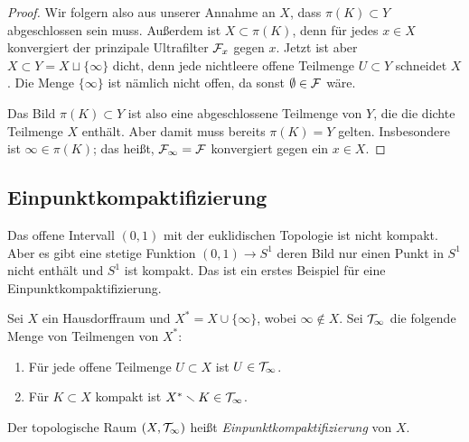 \begin{proof}
  Wir folgern also aus unserer Annahme an $X$, dass $\pi(K)\subset Y$ abgeschlossen sein muss. Außerdem ist $X\subset\pi(K)$, denn für jedes $x\in X$ konvergiert der prinzipale Ultrafilter $\cal F_x$ gegen $x$. Jetzt ist aber $X\subset Y = X\sqcup\{\infty\}$ dicht, denn jede nichtleere offene Teilmenge $U\subset Y$ schneidet $X$. Die Menge $\{\infty\}$ ist nämlich nicht offen, da sonst $\emptyset\in\cal F$ wäre.

  Das Bild $\pi(K)\subset Y$ ist also eine abgeschlossene Teilmenge von $Y$, die die dichte Teilmenge $X$ enthält. Aber damit muss bereits $\pi(K) = Y$ gelten. Insbesondere ist $\infty\in\pi(K)$; das heißt, $\cal F_\infty = \cal F$ konvergiert gegen ein $x\in X$.
\end{proof}

\subsection{Einpunktkompaktifizierung}
Das offene Intervall $(0,1)$ mit der euklidischen Topologie ist nicht kompakt. Aber es gibt eine stetige Funktion $(0,1)\to S^1$ deren Bild nur einen Punkt in $S^1$ nicht enthält und $S^1$ ist kompakt. Das ist ein erstes Beispiel für eine Einpunktkompaktifizierung.

\begin{definition}
Sei $X$ ein Hausdorffraum und $X^* = X\cup\{\infty\}$, wobei $\infty\not\in X$. Sei $\cal T_\infty$ die folgende Menge von Teilmengen von $X^*$:
\begin{enumerate}
\item Für jede offene Teilmenge $U\subset X$ ist $U\in\cal T_\infty$.
\item Für $K\subset X$ kompakt ist $X^*\setminus K\in\cal T_\infty$.
\end{enumerate}
Der topologische Raum $(X,\cal T_\infty)$ heißt \emph{Einpunktkompaktifizierung} von $X$.
\end{definition}

